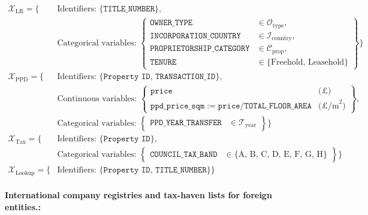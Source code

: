 \documentclass[12pt]{article}
\begin{document}
\begin{align*}
\mathcal{X}_{\text{LR}} = \Big\{
  &\text{Identifiers: }
    \{\texttt{TITLE\_NUMBER}\},\\
  &\text{Categorical variables: }
    \left\{
      \begin{array}{ll}
        \texttt{OWNER\_TYPE} & \in \mathcal{O}_{\text{type}}, \\
        \texttt{INCORPORATION\_COUNTRY} & \in \mathcal{I}_{\text{country}}, \\
        \texttt{PROPRIETORSHIP\_CATEGORY} & \in \mathcal{C}_{\text{prop}}, \\
        \texttt{TENURE} & \in \{\text{Freehold, Leasehold}\}
      \end{array}
    \right\}
\Big\}
\\
\mathcal{X}_{\text{PPD}}= \Big\{
  &\text{Identifiers: }
    \{\texttt{Property ID},\,\texttt{TRANSACTION\_ID}\},\\
  &\text{Continuous variables: }
    \left\{
      \begin{array}{ll}
        \texttt{price} & \text{(£)}\\
        \texttt{ppd\_price\_sqm} := \texttt{price} / \texttt{TOTAL\_FLOOR\_AREA} & \text{(£/m}^2\text{)}
      \end{array}
    \right\},\\
  &\text{Categorical variables: }
    \left\{
      \begin{array}{ll}
        \texttt{PPD\_YEAR\_TRANSFER} & \in \mathcal{T}_{\text{year}}
      \end{array}
    \right\}
\Big\} \\
\mathcal{X}_{\text{Tax}} = \Big\{
  &\text{Identifiers: }
    \{\texttt{Property ID}\},\\
  &\text{Categorical variables: }
    \left\{
      \begin{array}{ll}
        \texttt{COUNCIL\_TAX\_BAND} & \in \{\text{A, B, C, D, E, F, G, H}\}
      \end{array}
    \right\}
\Big\} \\
\mathcal{X}_{\text{Lookup}} = \Big\{
  &\text{Identifiers: }
    \{\texttt{Property ID},\,\texttt{TITLE\_NUMBER}\}
\Big\}
\end{align*}
\fi

\paragraph{International company registries and tax-haven lists for foreign entities.:} 

    
\end{document}
